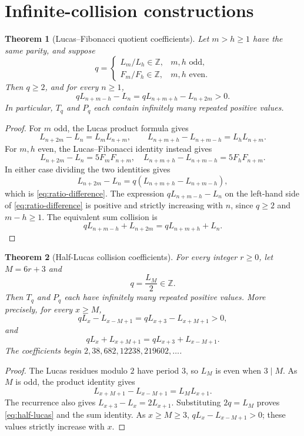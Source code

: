 \documentclass[11pt]{article}
\newtheorem{theorem}{Theorem}[section]
\begin{document}
\section{Infinite-collision constructions}
\begin{theorem}[Lucas--Fibonacci quotient coefficients]
\label{thm:ratios}
Let $m>h\ge1$ have the same parity, and suppose
\[
q=
\begin{cases}
L_m/L_h\in\mathbb Z,& m,h\text{ odd},\\
F_m/F_h\in\mathbb Z,& m,h\text{ even}.
\end{cases}
\]
Then $q\ge2$, and for every $n\ge1$,
\begin{equation}\label{eq:ratio-difference}
qL_{n+m-h}-L_n
=qL_{n+m+h}-L_{n+2m}>0.
\end{equation}
In particular, $T_q$ and $P_q$ each contain infinitely
many repeated positive values.
\end{theorem}
\begin{proof}
For $m$ odd, the Lucas product formula gives
\[
L_{n+2m}-L_n=L_mL_{n+m},\qquad
L_{n+m+h}-L_{n+m-h}=L_hL_{n+m}.
\]
For $m,h$ even, the Lucas--Fibonacci identity instead gives
\[
L_{n+2m}-L_n=5F_mF_{n+m},\quad
L_{n+m+h}-L_{n+m-h}=5F_hF_{n+m}.
\]
In either case dividing the two identities
gives
\[
L_{n+2m}-L_n
=q(L_{n+m+h}-L_{n+m-h}),
\]
which is \eqref{eq:ratio-difference}.
The expression $qL_{n+m-h}-L_n$ on the left-hand side of
\eqref{eq:ratio-difference} is positive and strictly
increasing with $n$, since $q\ge2$ and $m-h\ge1$.
The equivalent sum collision is
\[
qL_{n+m-h}+L_{n+2m}
=qL_{n+m+h}+L_n.
\]
\end{proof}




\begin{theorem}[Half-Lucas collision coefficients]
\label{thm:half-lucas}
For every integer $r\ge0$, let $M=6r+3$ and
\[
q=\frac{L_M}{2}\in\mathbb Z.
\]
Then $T_q$ and $P_q$ each have infinitely many
repeated positive values. More precisely, for
every $x\ge M$,
\begin{equation}\label{eq:half-lucas}
qL_x-L_{x-M+1}
=qL_{x+3}-L_{x+M+1}>0,
\end{equation}
and
\[
qL_x+L_{x+M+1}
=qL_{x+3}+L_{x-M+1}.
\]
The coefficients begin
$2,38,682,12238,219602,\ldots$.
\end{theorem}
\begin{proof}
The Lucas residues modulo $2$ have period $3$,
so $L_M$ is even when $3\mid M$.
As $M$ is odd, the product identity gives
\[
L_{x+M+1}-L_{x-M+1}=L_ML_{x+1}.
\]
The recurrence also gives
$L_{x+3}-L_x=2L_{x+1}$.
Substituting $2q=L_M$ proves
\eqref{eq:half-lucas} and the sum identity.
As $x\ge M\ge3$,
$qL_x-L_{x-M+1}>0$; these values
strictly increase with $x$.
\end{proof}
\end{document}
